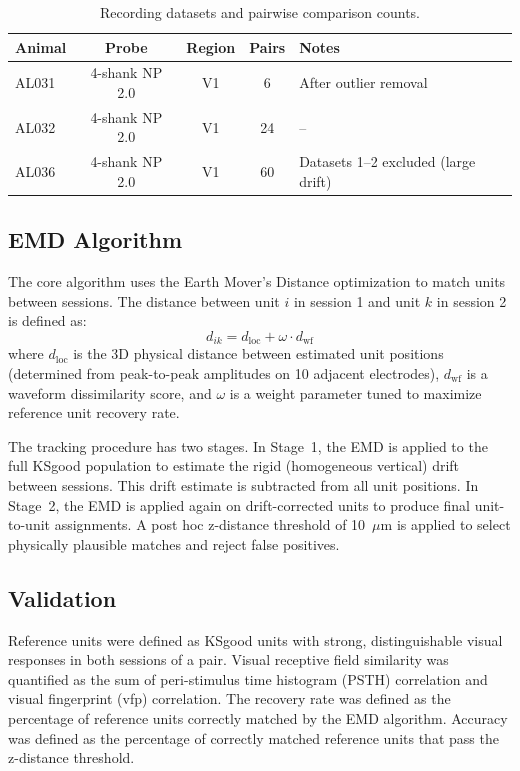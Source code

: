 \documentclass[12pt]{article}
\begin{document}
\begin{table}[ht]
\centering
\caption{Recording datasets and pairwise comparison counts.}
\label{tab:animals}
\begin{tabular}{lcccl}
\toprule
Animal & Probe & Region & Pairs & Notes \\
\midrule
AL031 & 4-shank NP 2.0 & V1 & 6 & After outlier removal \\
AL032 & 4-shank NP 2.0 & V1 & 24 & -- \\
AL036 & 4-shank NP 2.0 & V1 & 60 & Datasets 1--2 excluded (large drift) \\
\bottomrule
\end{tabular}
\end{table}

\subsection{EMD Algorithm}

The core algorithm uses the Earth Mover's Distance optimization to match units between sessions. The distance between unit $i$ in session 1 and unit $k$ in session 2 is defined as:
\begin{equation}
d_{ik} = d_{\text{loc}} + \omega \cdot d_{\text{wf}}
\label{eq:dist}
\end{equation}
where $d_{\text{loc}}$ is the 3D physical distance between estimated unit positions (determined from peak-to-peak amplitudes on 10 adjacent electrodes), $d_{\text{wf}}$ is a waveform dissimilarity score, and $\omega$ is a weight parameter tuned to maximize reference unit recovery rate.

The tracking procedure has two stages. In Stage~1, the EMD is applied to the full KSgood population to estimate the rigid (homogeneous vertical) drift between sessions. This drift estimate is subtracted from all unit positions. In Stage~2, the EMD is applied again on drift-corrected units to produce final unit-to-unit assignments. A post hoc z-distance threshold of 10~$\mu$m is applied to select physically plausible matches and reject false positives.

\subsection{Validation}

Reference units were defined as KSgood units with strong, distinguishable visual responses in both sessions of a pair. Visual receptive field similarity was quantified as the sum of peri-stimulus time histogram (PSTH) correlation and visual fingerprint (vfp) correlation. The recovery rate was defined as the percentage of reference units correctly matched by the EMD algorithm. Accuracy was defined as the percentage of correctly matched reference units that pass the z-distance threshold.
\end{document}
